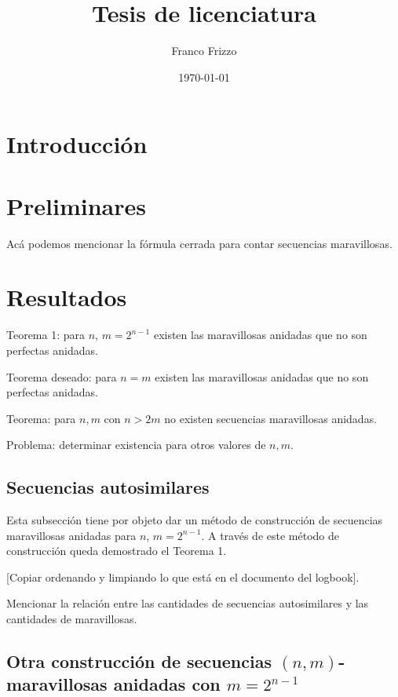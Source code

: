 \documentclass[11pt]{article}
\newcommand\myauthor{Franco Frizzo}
\newcommand\mytitle{Tesis de licenciatura}
\newcommand\mydate{\today}
\begin{document}
\title{\mytitle}
\author{\myauthor}
\date{\mydate}

\maketitle
\tableofcontents

\section{Introducción}

\section{Preliminares}

Acá podemos mencionar la fórmula cerrada para contar secuencias maravillosas.

\section{Resultados}

Teorema 1: para $n$, $m = 2^{n-1}$ existen las maravillosas anidadas que no son perfectas anidadas.

Teorema deseado: para $n = m$ existen las maravillosas anidadas que no son perfectas anidadas.

Teorema: para $n, m$ con $n > 2m$ no existen secuencias maravillosas anidadas.

Problema: determinar existencia para otros valores de $n, m$.

\subsection{Secuencias autosimilares}

Esta subsección tiene por objeto dar un método de construcción de secuencias maravillosas anidadas
para $n$, $m = 2^{n - 1}$. A través de este método
de construcción queda demostrado el Teorema 1.

	[Copiar ordenando y limpiando lo que está en el documento del logbook].

Mencionar la relación entre las cantidades de secuencias autosimilares y las cantidades de maravillosas.

\subsection{Otra construcción de secuencias $(n,m)$-maravillosas anidadas con $m = 2^{n - 1}$}
\end{document}
